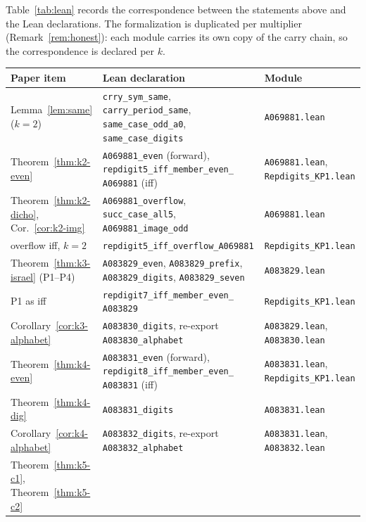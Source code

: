 \documentclass[12pt]{article}
\begin{document}
Table~\ref{tab:lean} records the correspondence between
the statements above and the Lean declarations. The
formalization is duplicated per multiplier
(Remark~\ref{rem:honest}): each module carries its own
copy of the carry chain, so the correspondence is
declared per $k$.

\begin{table}[ht]
\centering
\small
{\footnotesize\setlength{\tabcolsep}{4pt}
\begin{tabular}{>{\raggedright\arraybackslash}p{4.4cm}%
>{\raggedright\arraybackslash}p{6.0cm}%
>{\raggedright\arraybackslash}p{3.8cm}}
\hline
Paper item & Lean declaration & Module \\
\hline
Lemma~\ref{lem:same} ($k=2$) &
\texttt{crry\_sym\_same}, \texttt{carry\_period\_same},
\texttt{same\_case\_odd\_a0}, \texttt{same\_case\_digits} &
\texttt{A069881.lean} \\
Theorem~\ref{thm:k2-even} & \texttt{A069881\_even} (forward),
\texttt{repdigit5\_iff\_member\_even\_}\allowbreak
\texttt{A069881} (iff) &
\texttt{A069881.lean}, \texttt{Repdigits\_KP1.lean} \\
Theorem~\ref{thm:k2-dicho}, Cor.~\ref{cor:k2-img} &
\texttt{A069881\_overflow}, \texttt{succ\_case\_all5},
\texttt{A069881\_image\_odd} & \texttt{A069881.lean} \\
overflow iff, $k=2$ &
\texttt{repdigit5\_iff\_overflow\_A069881} &
\texttt{Repdigits\_KP1.lean} \\
Theorem~\ref{thm:k3-israel} (P1--P4) &
\texttt{A083829\_even}, \texttt{A083829\_prefix},
\texttt{A083829\_digits}, \texttt{A083829\_seven} &
\texttt{A083829.lean} \\
P1 as iff & \texttt{repdigit7\_iff\_member\_even\_}%
\allowbreak \texttt{A083829} &
\texttt{Repdigits\_KP1.lean} \\
Corollary~\ref{cor:k3-alphabet} &
\texttt{A083830\_digits}, re-export
\texttt{A083830\_alphabet} & \texttt{A083829.lean},
\texttt{A083830.lean} \\
Theorem~\ref{thm:k4-even} & \texttt{A083831\_even}
(forward), \texttt{repdigit8\_iff\_member\_even\_}%
\allowbreak \texttt{A083831} (iff) & \texttt{A083831.lean},
\texttt{Repdigits\_KP1.lean} \\
Theorem~\ref{thm:k4-dig} & \texttt{A083831\_digits} &
\texttt{A083831.lean} \\
Corollary~\ref{cor:k4-alphabet} &
\texttt{A083832\_digits}, re-export
\texttt{A083832\_alphabet} & \texttt{A083831.lean},
\texttt{A083832.lean} \\
Theorem~\ref{thm:k5-c1}, Theorem~\ref{thm:k5-c2} &

\end{tabular}}
\end{table}
\end{document}
